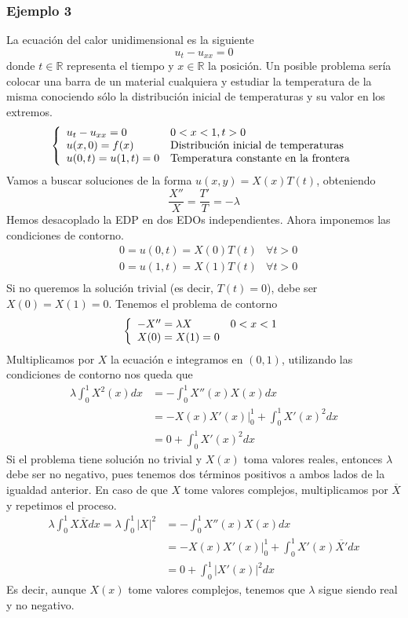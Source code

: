 \subsubsection*{Ejemplo 3}
La ecuación del calor unidimensional es la siguiente
$$u_t-u_{xx}=0$$
donde $t\in\mathbb{R}$ representa el tiempo y $x\in\mathbb{R}$ la posición.
Un posible problema sería colocar una barra de un material cualquiera y estudiar la temperatura de la misma conociendo sólo la distribución inicial de temperaturas y su valor en los extremos.
\begin{equation*}
\left\{
\begin{array}{l l}
u_t-u_{xx}=0 & 0<x<1, t>0\\
u(x,0)=f(x)& \text{Distribución inicial de temperaturas}\\
u(0,t)=u(1,t) = 0 & \text{Temperatura constante en la frontera}
\end{array}
\right.
\end{equation*}
Vamos a buscar soluciones de la forma $u(x,y) = X(x)T(t)$, obteniendo
$$\frac{X''}{X}=\frac{T'}{T}=-\lambda$$
Hemos desacoplado la EDP en dos EDOs independientes. Ahora imponemos las condiciones de contorno.
\begin{align*}
& 0=u(0,t) = X(0)T(t) & \forall t>0\\
& 0=u(1,t) = X(1)T(t) & \forall t>0\\
\end{align*}
Si no queremos la solución trivial (es decir, $T(t) = 0$), debe ser $X(0)=X(1)=0$.
Tenemos el problema de contorno
\begin{equation*}
\left\{
\begin{array}{l l}
-X''=\lambda X & 0<x<1\\
X(0)=X(1)=0
\end{array}
\right.
\end{equation*}
Multiplicamos por $X$ la ecuación e integramos en $(0,1)$, utilizando las condiciones de contorno nos queda que
\begin{align*}
\lambda \int_0^1X^2(x)dx & = -\int_0^1X''(x)X(x)dx\\
	& = \left.-X(x)X'(x)\right|_0^1 + \int_0^1X'(x)^2dx\\
	& = 0 + \int_0^1X'(x)^2dx
\end{align*}
Si el problema tiene solución no trivial y $X(x)$ toma valores reales, entonces $\lambda$ debe ser no negativo, pues tenemos dos términos positivos a ambos lados de la igualdad anterior. En caso de que $X$ tome valores complejos, multiplicamos por $\overline{X}$ y repetimos el proceso.
\begin{align*}
\lambda \int_0^1X\overline{X}dx = \lambda \int_0^1 |X|^2 & = -\int_0^1X''(x)X(x)dx\\
	& = \left.-X(x)X'(x)\right|_0^1 + \int_0^1X'(x)\overline{X'}dx\\
	& = 0 + \int_0^1|X'(x)|^2dx
\end{align*}
Es decir, aunque $X(x)$ tome valores complejos, tenemos que $\lambda$ sigue siendo real y no negativo.

